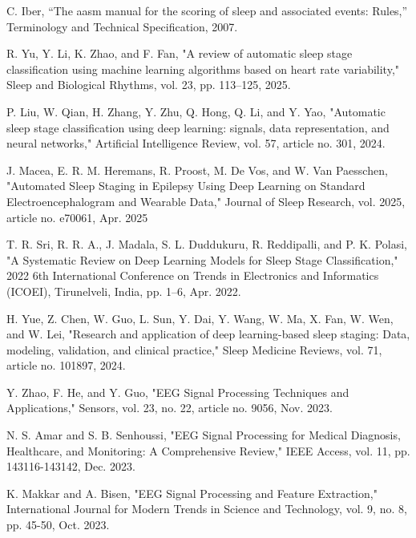 \documentclass[conference]{IEEEtran}
\begin{document}
\begin{thebibliography}{1}

C. Iber, “The aasm manual for the scoring of sleep and associated events:
Rules,” Terminology and Technical Specification, 2007.

R. Yu, Y. Li, K. Zhao, and F. Fan, "A review of automatic sleep stage classification using machine learning algorithms based on heart rate variability," Sleep and Biological Rhythms, vol. 23, pp. 113–125, 2025.

P. Liu, W. Qian, H. Zhang, Y. Zhu, Q. Hong, Q. Li, and Y. Yao, "Automatic sleep stage classification using deep learning: signals, data representation, and neural networks," Artificial Intelligence Review, vol. 57, article no. 301, 2024.

J. Macea, E. R. M. Heremans, R. Proost, M. De Vos, and W. Van Paesschen, "Automated Sleep Staging in Epilepsy Using Deep Learning on Standard Electroencephalogram and Wearable Data," Journal of Sleep Research, vol. 2025, article no. e70061, Apr. 2025

T. R. Sri, R. R. A., J. Madala, S. L. Duddukuru, R. Reddipalli, and P. K. Polasi, "A Systematic Review on Deep Learning Models for Sleep Stage Classification," 2022 6th International Conference on Trends in Electronics and Informatics (ICOEI), Tirunelveli, India, pp. 1–6, Apr. 2022.

H. Yue, Z. Chen, W. Guo, L. Sun, Y. Dai, Y. Wang, W. Ma, X. Fan, W. Wen, and W. Lei, "Research and application of deep learning-based sleep staging: Data, modeling, validation, and clinical practice," Sleep Medicine Reviews, vol. 71, article no. 101897, 2024.

Y. Zhao, F. He, and Y. Guo, "EEG Signal Processing Techniques and Applications," Sensors, vol. 23, no. 22, article no. 9056, Nov. 2023.

N. S. Amar and S. B. Senhoussi, "EEG Signal Processing for Medical Diagnosis, Healthcare, and Monitoring: A Comprehensive Review," IEEE Access, vol. 11, pp. 143116-143142, Dec. 2023.

K. Makkar and A. Bisen, "EEG Signal Processing and Feature Extraction," International Journal for Modern Trends in Science and Technology, vol. 9, no. 8, pp. 45-50, Oct. 2023.

\end{thebibliography}
\end{document}
